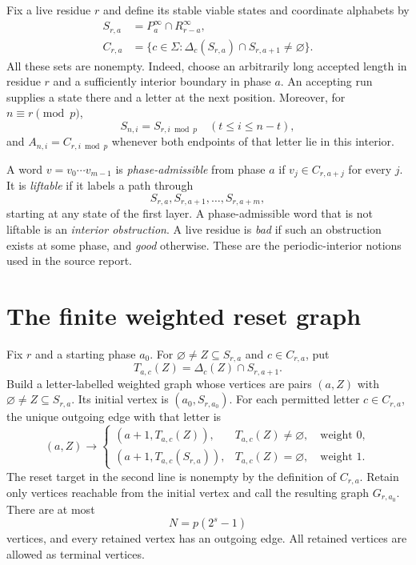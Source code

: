 \documentclass[11pt,letterpaper]{article}
\theoremstyle{definition}
\theoremstyle{remark}
\begin{document}
Fix a live residue $r$ and define its stable viable states and coordinate alphabets by
\begin{align}
S_{r,a}&=P^\infty_a\cap R^\infty_{r-a},\label{ccc:rs:eq:stable-states}\\
C_{r,a}&=\{c\in\Sigma:\Delta_c(S_{r,a})\cap S_{r,a+1}\ne\varnothing\}.
\label{ccc:rs:eq:stable-alphabet}
\end{align}
All these sets are nonempty. Indeed, choose an arbitrarily long accepted length in residue $r$ and a sufficiently interior boundary in phase $a$. An accepting run supplies a state there and a letter at the next position. Moreover, for $n\equiv r\pmod p$,
\[
S_{n,i}=S_{r,i\bmod p}\quad(t\le i\le n-t),
\]
and $A_{n,i}=C_{r,i\bmod p}$ whenever both endpoints of that letter lie in this interior.

A word $v=v_0\cdots v_{m-1}$ is \emph{phase-admissible} from phase $a$ if $v_j\in C_{r,a+j}$ for every $j$. It is \emph{liftable} if it labels a path through
\[
S_{r,a},S_{r,a+1},\ldots,S_{r,a+m},
\]
starting at any state of the first layer. A phase-admissible word that is not liftable is an \emph{interior obstruction}. A live residue is \emph{bad} if such an obstruction exists at some phase, and \emph{good} otherwise. These are the periodic-interior notions used in the source report.

\section{The finite weighted reset graph}\label{ccc:rs:sec:graph}

Fix $r$ and a starting phase $a_0$. For $\varnothing\ne Z\subseteq S_{r,a}$ and $c\in C_{r,a}$, put
\[
T_{a,c}(Z)=\Delta_c(Z)\cap S_{r,a+1}.
\]
Build a letter-labelled weighted graph whose vertices are pairs $(a,Z)$ with $\varnothing\ne Z\subseteq S_{r,a}$. Its initial vertex is $(a_0,S_{r,a_0})$. For each permitted letter $c\in C_{r,a}$, the unique outgoing edge with that letter is
\begin{equation}\label{ccc:rs:eq:reset}
(a,Z)\longrightarrow
\begin{cases}
(a+1,T_{a,c}(Z)),&T_{a,c}(Z)\ne\varnothing,\quad\text{weight }0,\\
(a+1,T_{a,c}(S_{r,a})),&T_{a,c}(Z)=\varnothing,\quad\text{weight }1.
\end{cases}
\end{equation}
The reset target in the second line is nonempty by the definition of $C_{r,a}$. Retain only vertices reachable from the initial vertex and call the resulting graph $G_{r,a_0}$. There are at most
\[
N=p(2^s-1)
\]
vertices, and every retained vertex has an outgoing edge. All retained vertices are allowed as terminal vertices.
\end{document}
